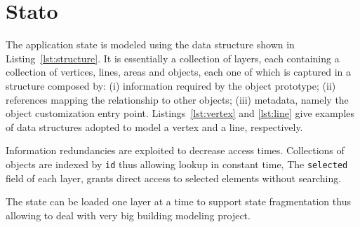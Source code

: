 \section{Stato}
\label{sec:chapter_2_section_2}

The application state is modeled using the data structure shown in Listing~\ref{lst:structure}. It is essentially a collection of layers, each containing a collection of vertices, lines, areas and objects, each one of which is captured in a structure composed by: (i) information required by the object prototype; (ii) references mapping the relationship to other objects; (iii) metadata, namely the object customization entry point. Listings~\ref{lst:vertex} and \ref{lst:line} give examples of data structures adopted to model a vertex and a line, respectively.

Information redundancies are exploited to decrease access times. Collections of objects are indexed by \texttt{id} thus allowing lookup in constant time, The \texttt{selected} field of each layer, grants direct access to selected elements without searching.

The state can be loaded one layer at a time to support state fragmentation thus allowing to deal with very big building modeling project.

